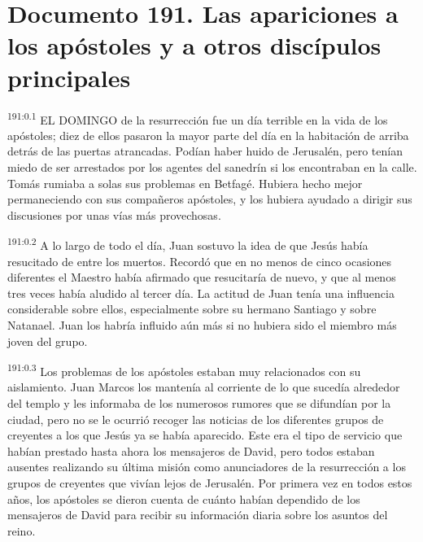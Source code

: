 \chapter{Documento 191. Las apariciones a los apóstoles y a otros discípulos principales}
\par 
\textsuperscript{191:0.1} EL DOMINGO de la resurrección fue un día terrible en la vida de los apóstoles; diez de ellos pasaron la mayor parte del día en la habitación de arriba detrás de las puertas atrancadas. Podían haber huido de Jerusalén, pero tenían miedo de ser arrestados por los agentes del sanedrín si los encontraban en la calle. Tomás rumiaba a solas sus problemas en Betfagé. Hubiera hecho mejor permaneciendo con sus compañeros apóstoles, y los hubiera ayudado a dirigir sus discusiones por unas vías más provechosas.

\par 
\textsuperscript{191:0.2} A lo largo de todo el día, Juan sostuvo la idea de que Jesús había resucitado de entre los muertos. Recordó que en no menos de cinco ocasiones diferentes el Maestro había afirmado que resucitaría de nuevo, y que al menos tres veces había aludido al tercer día. La actitud de Juan tenía una influencia considerable sobre ellos, especialmente sobre su hermano Santiago y sobre Natanael. Juan los habría influido aún más si no hubiera sido el miembro más joven del grupo.

\par 
\textsuperscript{191:0.3} Los problemas de los apóstoles estaban muy relacionados con su aislamiento. Juan Marcos los mantenía al corriente de lo que sucedía alrededor del templo y les informaba de los numerosos rumores que se difundían por la ciudad, pero no se le ocurrió recoger las noticias de los diferentes grupos de creyentes a los que Jesús ya se había aparecido. Este era el tipo de servicio que habían prestado hasta ahora los mensajeros de David, pero todos estaban ausentes realizando su última misión como anunciadores de la resurrección a los grupos de creyentes que vivían lejos de Jerusalén. Por primera vez en todos estos años, los apóstoles se dieron cuenta de cuánto habían dependido de los mensajeros de David para recibir su información diaria sobre los asuntos del reino.

